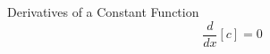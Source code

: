 \documentclass[12pt]{article}
\begin{document}
\begin{tcolorbox}
Derivatives of a Constant Function
$$ \frac{d}{dx}[c] = 0 $$
\end{tcolorbox}
\end{document}
